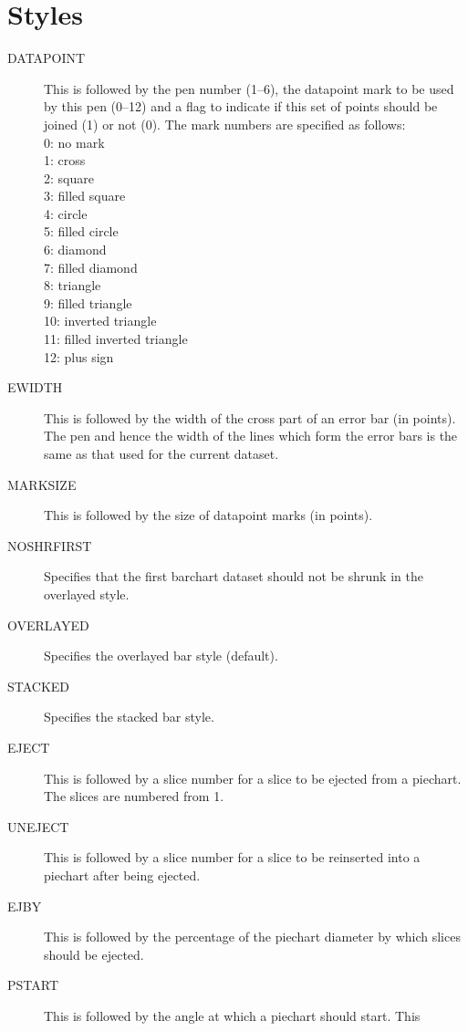 \section{Styles}
\label{sec:styles}
\begin{description}
\item[DATAPOINT] This is followed by the pen number (1--6), the datapoint mark
to be used by this pen (0--12) and a flag to indicate if this set of points should 
be joined (1) or not (0). The mark numbers are specified as follows:\\
0: no mark\\
1: cross\\
2: square\\
3: filled square\\
4: circle\\
5: filled circle\\
6: diamond\\
7: filled diamond\\
8: triangle\\
9: filled triangle\\
10: inverted triangle\\
11: filled inverted triangle\\
12: plus sign
\item[EWIDTH] This is followed by the width of the cross part of an error bar (in 
points). The pen and hence the width of the lines which form the error bars is the 
same as that used for the current dataset.
\item[MARKSIZE] This is followed by the size of datapoint marks (in points).
\item[NOSHRFIRST\dag] Specifies that the first barchart dataset should not be shrunk 
in the overlayed style.
\item[OVERLAYED] Specifies the overlayed bar style (default).
\item[STACKED] Specifies the stacked bar style.
\item[EJECT] This is followed by  a slice number for a slice to be ejected from a 
piechart. The slices are numbered from 1.
\item[UNEJECT\dag] This is followed by  a slice number for a slice to be reinserted into 
a piechart after being ejected.
\item[EJBY] This is followed by the percentage of the piechart diameter by which 
slices should be ejected.
\item[PSTART] This is followed by the angle at which a piechart should start. This 

\end{description}

